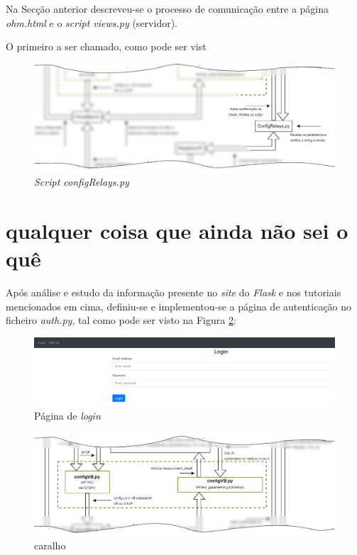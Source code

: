 Na Secção anterior descreveu-se o processo de comunicação entre a página \textit{ohm.html} e o \textit{script views.py} (servidor).

O primeiro a ser chamado, como pode ser vist
\begin{figure}[hbtp]
	\centering
	\includegraphics[width=1\textwidth]{figures/ohm_diagramaCUTRelay.drawio.png}
	\caption{\textit{Script configRelays.py}}
	\label{fig:cutconfigRelays}
\end{figure}

\section{qualquer coisa que ainda não sei o quê}

Após análise e estudo da informação presente no \textit{site} do \textit{Flask} e nos tutoriais mencionados em cima, definiu-se e implementou-se a página de autenticação no ficheiro \textit{auth.py}, tal como pode ser visto na Figura \ref{fig:paglogin}:

\begin{figure}[hbtp]
	\centering
	\includegraphics[width=1\textwidth]{figures/login.png}
	\caption{Página de \textit{login}}
	\label{fig:paglogin}
\end{figure}

\begin{figure}[hbtp]
	\centering
	\includegraphics[width=1\textwidth]{figures/ohm_diagramaCUT.drawio.png}
	\caption{caralho}
	\label{fig:diagramaCUT}
\end{figure}

